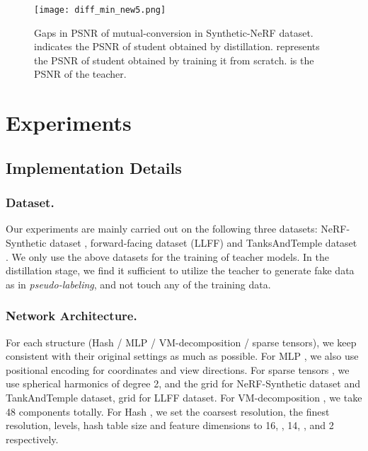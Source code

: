 \documentclass[letterpaper]{article} \usepackage{aaai23}  \usepackage{times}  \usepackage{helvet}  \usepackage{courier}  \usepackage[hyphens]{url}  \usepackage{graphicx} \urlstyle{rm} \def\UrlFont{\rm}  \usepackage{natbib}  \usepackage{caption} \frenchspacing  \setlength{\pdfpagewidth}{8.5in}  \setlength{\pdfpageheight}{11in}  \usepackage{multirow}
\begin{document}
\begin{figure}[t]
\centering
\texttt{[image: diff\_min\_new5.png]} \caption{Gaps in PSNR of mutual-conversion in Synthetic-NeRF dataset.  indicates the PSNR of student obtained by distillation.  represents the PSNR of student obtained by training it from scratch.  is the PSNR of the teacher.}
\label{fig-heatmap}
\end{figure}
\section{Experiments}
\subsection{Implementation Details}
\subsubsection{Dataset.}Our experiments are mainly carried out on the following three datasets: NeRF-Synthetic dataset  \cite{mildenhall2020NeRF}, forward-facing dataset (LLFF) \cite{mildenhall2019llff} and TanksAndTemple dataset \cite{knapitsch2017tanks}. We only use the above datasets for the training of teacher models. In the distillation stage, we find it sufficient to utilize the teacher to generate fake data as in \textit{pseudo-labeling}, and not touch any of the training data.
\subsubsection{Network Architecture.}
For each structure (Hash / MLP / VM-decomposition / sparse tensors), we keep consistent with their original settings as much as possible. For MLP \cite{lin2020NeRFpytorch}, we also use positional encoding for coordinates and view directions. For sparse tensors \cite{fridovich2022plenoxels}, we use spherical harmonics of degree 2, and the  grid for NeRF-Synthetic dataset and TankAndTemple dataset,  grid for LLFF dataset. For VM-decomposition \cite{chen2022tensorf}, we take 48 components totally. For Hash \cite{muller2022instant}, we set the coarsest resolution, the finest resolution, levels, hash table size and feature dimensions to 16, , 14, , and 2 respectively. 
\end{document}
